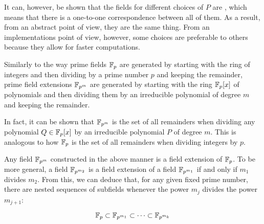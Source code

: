 It can, however, be shown that the fields for different choices of $P$ are , which means that there is a one-to-one correspondence between all of them. As a result, from an abstract point of view, they are the same thing. From an implementations point of view, however, some choices are preferable to others because they allow for faster computations.

\begin{remark}
Similarly to the way prime fields $\mathbb{F}_p$ are generated by starting with the ring of integers and then dividing by a prime number $p$ and keeping the remainder, prime field extensions $\mathbb{F}_{p^m}$ are generated by starting with the ring $\mathbb{F}_p[x]$ of polynomials and then dividing them by an irreducible polynomial of degree $m$ and keeping the remainder.

In fact, it can be shown that $\mathbb{F}_{p^m}$ is the set of all remainders when dividing any polynomial $Q\in \mathbb{F}_p[x]$ by an irreducible polynomial $P$ of degree $m$. This is analogous to how $\mathbb{F}_p$ is the set of all remainders when dividing integers by $p$.
\end{remark}

Any field $\mathbb{F}_{p^m}$ constructed in the above manner is a field extension of $\mathbb{F}_p$. To be more general, a field $\mathbb{F}_{p^{m_2}}$ is a field extension of a field $\mathbb{F}_{p^{m_1}}$ if and only if $m_1$ divides $m_2$. From this, we can deduce that, for any given fixed prime number, there are nested sequences of subfields whenever the power $m_j$ divides the power $m_{j+1}$:

\begin{equation}
\mathbb{F}_p \subset \mathbb{F}_{p^{m_1}} \subset \cdots \subset \mathbb{F}_{p^{m_k}}
\end{equation}

